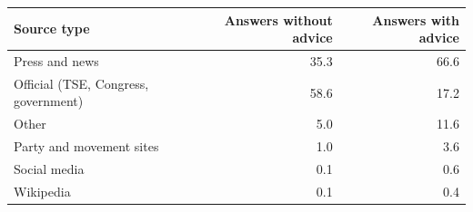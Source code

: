 \begin{tabular}{lrr}
\toprule
Source type & Answers without advice & Answers with advice \\
\midrule
Press and news & 35.3 & 66.6 \\
Official (TSE, Congress, government) & 58.6 & 17.2 \\
Other & 5.0 & 11.6 \\
Party and movement sites & 1.0 & 3.6 \\
Social media & 0.1 & 0.6 \\
Wikipedia & 0.1 & 0.4 \\
\bottomrule
\end{tabular}
